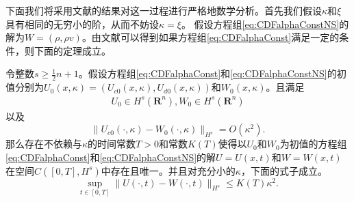 	下面我们将采用文献\cite{yang2015validity}的结果对这一过程进行严格地数学分析。首先我们假设$\kappa$和$\xi$具有相同的无穷小的阶，从而不妨设$\kappa = \xi$。
	假设方程组\eqref{eq:CDFalphaConstNS}的解为$W = (\rho,\rho v)$。由文献\cite{yang2015validity}可以得到如果方程组\eqref{eq:CDFalphaConst}满足一定的条件，则下面的定理成立。
	\begin{theorem} \label{th:chapmanenskog}
		令整数$s \ge \frac{1}{2}n+1$。假设方程组\eqref{eq:CDFalphaConst}和\eqref{eq:CDFalphaConstNS}的初值分别为$U_0(x,\kappa) = (U_{c0}(x,\kappa),U_{d0}(x,\kappa))$和$W_0(x,\kappa)$。且满足
		\begin{eqnarray}
			U_0 \in H^s(\mathbf{R}^n), W_0 \in H^s(\mathbf{R}^n)
		\end{eqnarray}
		以及
		\begin{equation*}
			\|U_{c0}(\cdot,\kappa) - W_0(\cdot, \kappa) \|_{H^s} = O(\kappa^2).
		\end{equation*}
		那么存在不依赖与$\kappa$的时间常数$T>0$和常数$K(T)$使得以$U_0$和$W_0$为初值的方程组\eqref{eq:CDFalphaConst}和\eqref{eq:CDFalphaConstNS}的解$U=U(x,t)$和$W=W(x,t)$在空间$C([0,T],H^s)$中存在且唯一。并且对充分小的$\kappa$，下面的式子成立。
		\begin{equation}
			\sup_{t \in [0,T]} \| U(\cdot,t) - W(\cdot,t) \|_{H^s} \le K(T) \kappa^2.
		\end{equation}
	\end{theorem}

